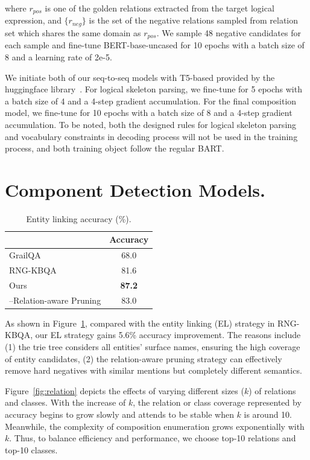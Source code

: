 \noindent where $r_{pos}$ is one of the golden relations extracted from the target logical expression, and $\{r_{neg}\}$ is the set of the negative relations sampled from relation set which shares the same domain as $r_{pos}$. We sample 48 negative candidates for each sample and fine-tune BERT-base-uncased for 10 epochs with a batch size of 8 and a learning rate of 2e-5.

 We initiate both of our seq-to-seq models with T5-based provided by the huggingface library~\cite{wolf-etal-2020-transformers}. For logical skeleton parsing, we fine-tune for 5 epochs with a batch size of 4 and a 4-step gradient accumulation. For the final composition model, we fine-tune for 10 epochs with a batch size of 8 and a 4-step gradient accumulation. To be noted, both the designed rules for logical skeleton parsing and vocabulary constraints in decoding process will not be used in the training process, and both training object follow the regular BART.

\section{Component Detection Models.}

\begin{table}[t]
\caption{Entity linking accuracy (\%).}
\label{tb:entity-link}
\centering
\begin{tabular}{lc}
\hline
                              & Accuracy     \\ \hline
GrailQA                       & 68.0          \\
RNG-KBQA                      & 81.6          \\ \hline
Ours                          & \textbf{87.2} \\
\quad--Relation-aware Pruning & 83.0          \\ \hline
\end{tabular}
\end{table}

As shown in Figure~\ref{tb:entity-link}, compared with the entity linking (EL) strategy in RNG-KBQA, our EL strategy gains 5.6\% accuracy improvement. The reasons include (1) the trie tree considers all entities' surface names, ensuring the high coverage of entity candidates, (2) the relation-aware pruning strategy can effectively remove hard negatives with similar mentions but completely different semantics. 

Figure~\ref{fig:relation} depicts the effects of varying different sizes ($k$) of relations and classes. With the increase of $k$, the relation or class coverage represented by accuracy begins to grow slowly and attends to be stable when $k$ is around 10. Meanwhile, the complexity of composition enumeration grows exponentially with $k$. Thus, to balance efficiency and performance, we choose top-10 relations and top-10 classes.


